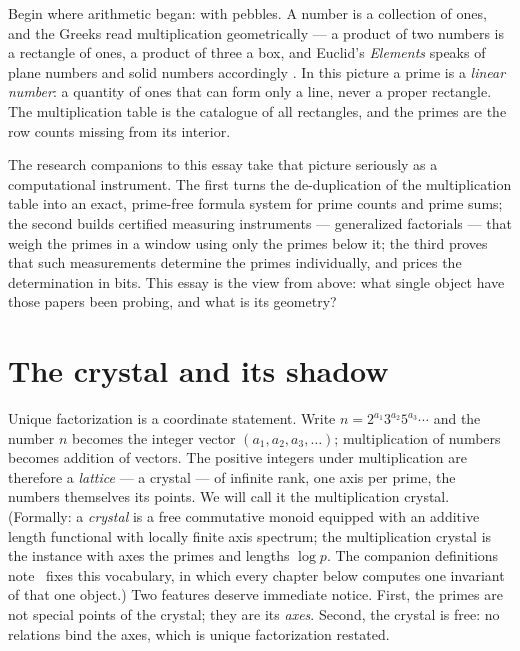 \documentclass[11pt]{article}
\theoremstyle{remark}
\begin{document}
Begin where arithmetic began: with pebbles. A number is a collection of ones, and the Greeks read
multiplication geometrically --- a product of two numbers is a rectangle of ones, a product of three
a box, and Euclid's \emph{Elements} speaks of plane numbers and solid numbers accordingly
\cite{Euclid}. In this picture a prime is a \emph{linear number}: a quantity of ones that can form
only a line, never a proper rectangle. The multiplication table is the catalogue of all rectangles,
and the primes are the row counts missing from its interior.

The research companions to this essay take that picture seriously as a computational instrument. The
first \cite{CompanionI} turns the de-duplication of the multiplication table into an exact,
prime-free formula system for prime counts and prime sums; the second \cite{CompanionII} builds
certified measuring instruments --- generalized factorials --- that weigh the primes in a window
using only the primes below it; the third \cite{CompanionIII} proves that such measurements determine
the primes individually, and prices the determination in bits. This essay is the view from above:
what single object have those papers been probing, and what is its geometry?

\section{The crystal and its shadow}

Unique factorization is a coordinate statement. Write $n = 2^{a_1} 3^{a_2} 5^{a_3} \cdots$ and the
number $n$ becomes the integer vector $(a_1, a_2, a_3, \ldots)$; multiplication of numbers becomes
addition of vectors. The positive integers under multiplication are therefore a \emph{lattice} --- a
crystal --- of infinite rank, one axis per prime, the numbers themselves its points. We will call it
the multiplication crystal. (Formally: a \emph{crystal} is a free commutative monoid equipped with an additive length
functional with locally finite axis spectrum; the multiplication crystal is the instance with axes
the primes and lengths $\log p$. The companion definitions note~\cite{Defs} fixes this vocabulary,
in which every chapter below computes one invariant of that one object.) Two features deserve
immediate notice. First, the primes are not special
points of the crystal; they are its \emph{axes}. Second, the crystal is free: no relations bind the
axes, which is unique factorization restated.
\end{document}
